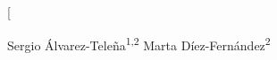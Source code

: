 \documentclass{article}
\begin{document}
\twocolumn[
\vspace{0.5em}
\begin{center}
Sergio Álvarez-Teleña\textsuperscript{1,2} \quad Marta Díez-Fernández\textsuperscript{2} \\
\end{center}
\vspace{0.5em}







\end{document}
